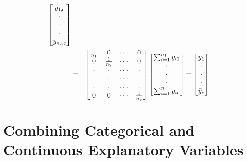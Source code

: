 \begin{frame}[shrink=10]
\begin{itemize}
\begin{eqnarray*}
\begin{bmatrix}
y_{1,c} \\
\cdot  \\
\cdot  \\
\cdot  \\
y_{n_{c},c}%
\end{bmatrix} \notag
\\
&=&%
\begin{bmatrix}
\frac{1}{n_1} & 0 & \cdot \cdot \cdot  & 0 \\
0 & \frac{1}{n_2} & \cdot \cdot \cdot  & 0 \\
\cdot  & \cdot  & \cdot \cdot \cdot  & \cdot  \\
\cdot  & \cdot  & \cdot \cdot \cdot  & \cdot  \\
\cdot  & \cdot  & \cdot \cdot \cdot  & \cdot  \\
0 & 0 & \cdot \cdot \cdot  & \frac{1}{n_c}
\end{bmatrix}
\begin{bmatrix}
\sum_{i=1}^{n_{1}}y_{i1} \\
\cdot  \\
\cdot  \\
\cdot  \\
\sum_{i=1}^{n_{c}}y_{ic}%
\end{bmatrix}%
=%
\begin{bmatrix}
\bar{y}_{1} \\
\cdot  \\
\cdot  \\
\cdot  \\
\bar{y}_{c}%
\end{bmatrix}%
\end{eqnarray*}
                     \end{itemize}
    \end{frame}


\section{Combining Categorical and Continuous Explanatory Variables}


